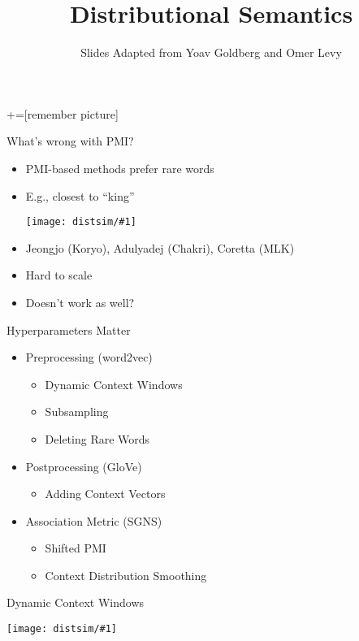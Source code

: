 \documentclass[compress]{beamer}
\title{Distributional Semantics}
\date{Slides Adapted from Yoav Goldberg and Omer Levy}
\newcommand{\gfx}[2]{
\begin{center}
	\texttt{[image: distsim/\#1]}
\end{center}
}
\begin{document}
+=[remember picture]



\begin{frame}
  \titlepage
\end{frame}

\begin{frame}{What's wrong with PMI?}

\begin{itemize}
  \item PMI-based methods prefer rare words
  \item E.g., closest to ``king''
    \gfx{king}{.8}
  \item Jeongjo (Koryo), Adulyadej (Chakri), Coretta (MLK)
  \item Hard to scale
  \item Doesn't work as well?
\end{itemize}

\end{frame}


\begin{frame}{Hyperparameters Matter}

\begin{itemize}
\item Preprocessing				(word2vec)
\begin{itemize}
\item \alert<2>{Dynamic Context Windows}
\item Subsampling
\item Deleting Rare Words
\end{itemize}

\item Postprocessing				(GloVe)
\begin{itemize}
\item \alert<2>{Adding Context Vectors}
\end{itemize}

\item Association Metric			(SGNS)
\begin{itemize}
\item Shifted PMI
\item \alert<2>{Context Distribution Smoothing}
\end{itemize}

\end{itemize}



\end{frame}

\begin{frame}{Dynamic Context Windows}

\gfx{window}{.95}

\end{frame}
\end{document}
